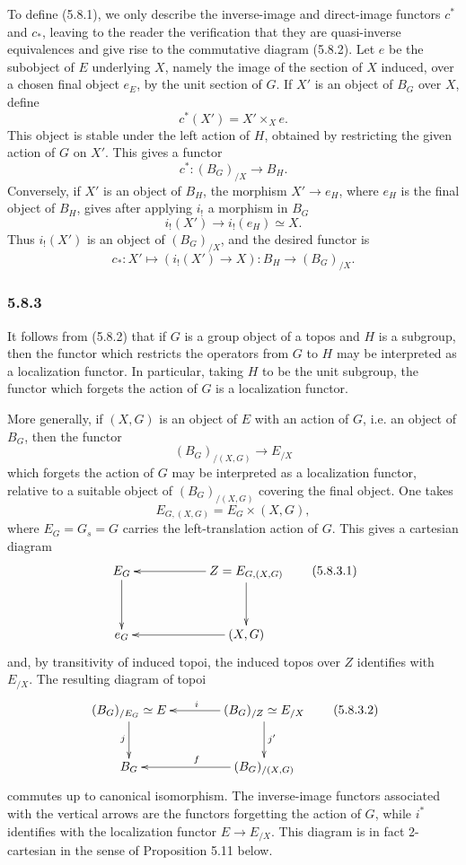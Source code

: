 \documentclass[11pt]{article}
\begin{document}
To define (5.8.1), we only describe the inverse-image and direct-image functors \(c^*\) and \(c_*\), leaving to the reader the verification that they are quasi-inverse equivalences and give rise to the commutative diagram (5.8.2). Let \(e\) be the subobject of \(E\) underlying \(X\), namely the image of the section of \(X\) induced, over a chosen final object \(e_E\), by the unit section of \(G\). If \(X'\) is an object of \(B_G\) over \(X\), define
\[
c^*(X')=X'\times_X e.
\]
This object is stable under the left action of \(H\), obtained by restricting the given action of \(G\) on \(X'\). This gives a functor
\[
c^*:(B_G)_{/X}\longrightarrow B_H.
\]
Conversely, if \(X'\) is an object of \(B_H\), the morphism \(X'\to e_H\), where \(e_H\) is the final object of \(B_H\), gives after applying \(i_!\) a morphism in \(B_G\)
\[
i_!(X')\longrightarrow i_!(e_H)\simeq X.
\]
Thus \(i_!(X')\) is an object of \((B_G)_{/X}\), and the desired functor is
\[
c_*:X'\longmapsto (i_!(X')\to X):B_H\longrightarrow (B_G)_{/X}.
\]

\subsubsection*{5.8.3}
It follows from (5.8.2) that if \(G\) is a group object of a topos and \(H\) is a subgroup, then the functor which restricts the operators from \(G\) to \(H\) may be interpreted as a localization functor. In particular, taking \(H\) to be the unit subgroup, the functor which forgets the action of \(G\) is a localization functor.

More generally, if \((X,G)\) is an object of \(E\) with an action of \(G\), i.e. an object of \(B_G\), then the functor
\[
(B_G)_{/(X,G)}\longrightarrow E_{/X}
\]
which forgets the action of \(G\) may be interpreted as a localization functor, relative to a suitable object of \((B_G)_{/(X,G)}\) covering the final object. One takes
\[
E_{G,(X,G)}=E_G\times(X,G),
\]
where \(E_G=G_s=G\) carries the left-translation action of \(G\). This gives a cartesian diagram
\[
\xymatrix@C=2cm@R=1.2cm{E_G\ar[d] & Z=E_{G,(X,G)}\ar[l]\ar[d]\\
e_G & (X,G)\ar[l]}
\tag{5.8.3.1}
\]
and, by transitivity of induced topoi, the induced topos over \(Z\) identifies with \(E_{/X}\). The resulting diagram of topoi
\[
\xymatrix@C=1.4cm@R=1cm{(B_G)_{/E_G}\simeq E\ar[d]_j & (B_G)_{/Z}\simeq E_{/X}\ar[l]_i\ar[d]^{j'}\\
B_G & (B_G)_{/(X,G)}\ar[l]_f}
\tag{5.8.3.2}
\]
commutes up to canonical isomorphism. The inverse-image functors associated with the vertical arrows are the functors forgetting the action of \(G\), while \(i^*\) identifies with the localization functor \(E\to E_{/X}\). This diagram is in fact 2-cartesian in the sense of Proposition 5.11 below.
\end{document}
